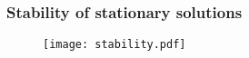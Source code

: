 \documentclass[10pt,aspectratio=169]{beamer}
\newenvironment{nalign}{
	\begin{equation}
	\begin{aligned}
}{
	\end{aligned}
	\end{equation}
	\ignorespacesafterend
}
\begin{document}


\begin{frame}
\frametitle{Stability of stationary solutions}

\begin{figure}
	\texttt{[image: stability.pdf]}
\end{figure}
\end{frame}

\end{document}

